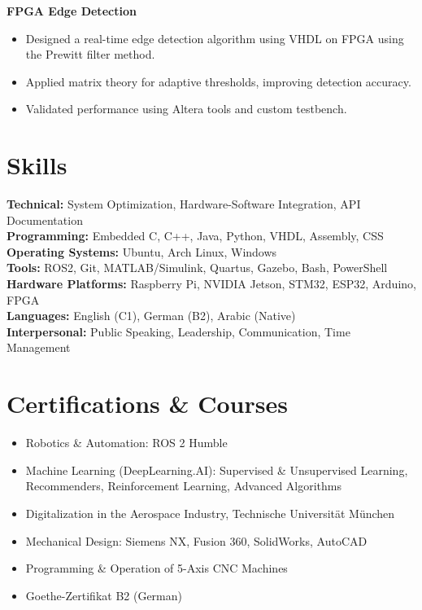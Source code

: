 \documentclass[a4paper,10pt]{article}
\begin{document}
\textbf{FPGA Edge Detection}
\begin{itemize}[noitemsep,topsep=0pt]
    \item Designed a real-time edge detection algorithm using VHDL on FPGA using the Prewitt filter method.
    \item Applied matrix theory for adaptive thresholds, improving detection accuracy.
    \item Validated performance using Altera tools and custom testbench.
\end{itemize}

\vspace{0.6em}

\section*{Skills}
\textbf{Technical:} System Optimization, Hardware-Software Integration, API Documentation\\
\textbf{Programming:} Embedded C, C++, Java, Python, VHDL, Assembly, CSS\\
\textbf{Operating Systems:} Ubuntu, Arch Linux, Windows\\
\textbf{Tools:} ROS2, Git, MATLAB/Simulink, Quartus, Gazebo, Bash, PowerShell\\
\textbf{Hardware Platforms:} Raspberry Pi, NVIDIA Jetson, STM32, ESP32, Arduino, FPGA\\
\textbf{Languages:} English (C1), German (B2), Arabic (Native)\\
\textbf{Interpersonal:} Public Speaking, Leadership, Communication, Time Management

\vspace{0.6em}

\section*{Certifications \& Courses}
\begin{itemize}[noitemsep,topsep=0pt]
    \item Robotics \& Automation: ROS 2 Humble
    \item Machine Learning (DeepLearning.AI): Supervised \& Unsupervised Learning, Recommenders, Reinforcement Learning, Advanced Algorithms
    \item Digitalization in the Aerospace Industry, Technische Universität München
    \item Mechanical Design: Siemens NX, Fusion 360, SolidWorks, AutoCAD
    \item Programming \& Operation of 5-Axis CNC Machines
    \item Goethe-Zertifikat B2 (German)
\end{itemize}
\end{document}
